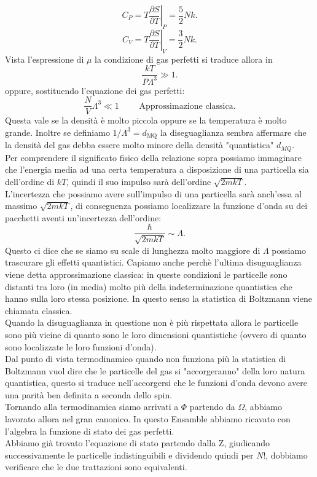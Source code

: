 \[
	C_{P} = T \left.\frac{\partial S}{\partial T} \right|_{P}= \frac{5}{2}Nk
.\] 
\[
	C_{V} = T \left.\frac{\partial S}{\partial T} \right|_{V} = \frac{3}{2} Nk
.\] 
Vista l'espressione di $\mu $ la condizione di gas perfetti si traduce allora in 
\[
	\frac{kT}{P \Lambda ^3} \gg 1
.\] 
oppure, sostituendo l'equazione dei gas perfetti:
\[
	\frac{N}{V} \Lambda ^3\ll 1 \quad \quad \text{ Approssimazione classica}
.\] 
Questa vale se la densità è molto piccola oppure se la temperatura è molto grande. Inoltre se definiamo $1 /\Lambda ^3 = d_{\text{MQ}}$ la diseguaglianza sembra affermare che la densità del gas debba essere molto minore della densità "quantistica" $d_{MQ}$. \\
Per comprendere il significato fisico della relazione sopra possiamo immaginare che l'energia media ad una certa temperatura a disposizione di una particella sia dell'ordine di $kT$, quindi il suo impulso sarà dell'ordine $\sqrt{2mkT}$.\\
L'incertezza che possiamo avere sull'impulso di una particella sarà anch'essa al massimo $\sqrt{2mkT} $, di conseguenza possiamo localizzare la funzione d'onda su dei pacchetti aventi un'incertezza dell'ordine:
\[
	 \frac{\hbar }{\sqrt{2mkT}} \sim \Lambda 
.\] 
Questo ci dice che se siamo su scale di lunghezza molto maggiore di $\Lambda $ possiamo trascurare gli effetti quantistici. Capiamo anche perchè l'ultima disuguaglianza viene detta approssimazione classica: in queste condizioni le particelle sono distanti tra loro (in media) molto più della indeterminazione quantistica che hanno sulla loro stessa posizione. In questo senso la statistica di Boltzmann viene chiamata classica.\\
Quando la disuguaglianza in questione non è più rispettata allora le particelle sono più vicine di quanto sono le loro dimensioni quantistiche (ovvero di quanto sono localizzate le loro funzioni d'onda).\\
Dal punto di vista termodinamico quando non funziona più la statistica di Boltzmann vuol dire che le particelle del gas si "accorgeranno" della loro natura quantistica, questo si traduce nell'accorgersi che le funzioni d'onda devono avere una parità ben definita a seconda dello spin.\\
Tornando alla termodinamica siamo arrivati a $\Phi $ partendo da $\Omega $, abbiamo lavorato allora nel gran canonico. In questo Ensamble abbiamo ricavato con l'algebra la funzione di stato dei gas perfetti.\\ 
Abbiamo già trovato l'equazione di stato partendo dalla Z, giudicando successivamente le particelle indistinguibili e dividendo quindi per $N!$, dobbiamo verificare che le due trattazioni sono equivalenti.\\
